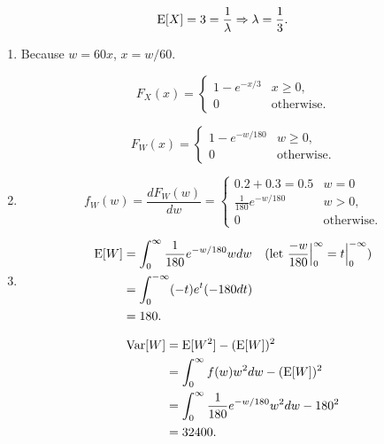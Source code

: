 \documentclass{article}
\begin{document}
\begin{enumerate}
    $$
    \text E[X] = 3 = \frac{1}{\lambda} \Rightarrow \lambda = \frac{1}{3}.
    $$
    
    \begin{enumerate}[label=(\alph*)]
        \item

        Because $w = 60x$, $x = w / 60$.

        $$
        F_X(x) = 
        \begin{cases}
            1 - e^{-x / 3} & x \ge 0, \\
            0 & \text{otherwise}.
        \end{cases}
        $$

        $$
        F_W(x) = 
        \begin{cases}
            1 - e^{-w / 180} & w \ge 0, \\
            0 & \text{otherwise}.
        \end{cases}
        $$

        \item

        $$
        f_W(w) = \frac{dF_W(w)}{dw} =
        \begin{cases}
        0.2 + 0.3 = 0.5 & w = 0 \\
        \frac{1}{180} e^{-w / 180} & w > 0, \\
        0 & \text{otherwise}.
        \end{cases}
        $$

        \item

        \begin{align*}
            \text E[W] & = \int_0^\infty \frac{1}{180} e^{-w / 180} w dw & (\text{let } \frac{-w}{180}\Big|_0^\infty = t\Big|_0^{-\infty}) \\
                       & = \int_0^{-\infty} (-t)e^t (-180 dt) \\
                       & = 180.
        \end{align*}

        \begin{align*}
            \text{Var}[W] & = \text E[W^2] - (\text E[W])^2 \\
                          & = \int_0^\infty f(w) w^2 dw - (\text E[W])^2 \\ 
                          & = \int_0^\infty \frac{1}{180} e^{-w / 180} w^2 dw - 180^2 \\
                          & = 32400.
        \end{align*}
    \end{enumerate}
\end{enumerate}
\end{document}
